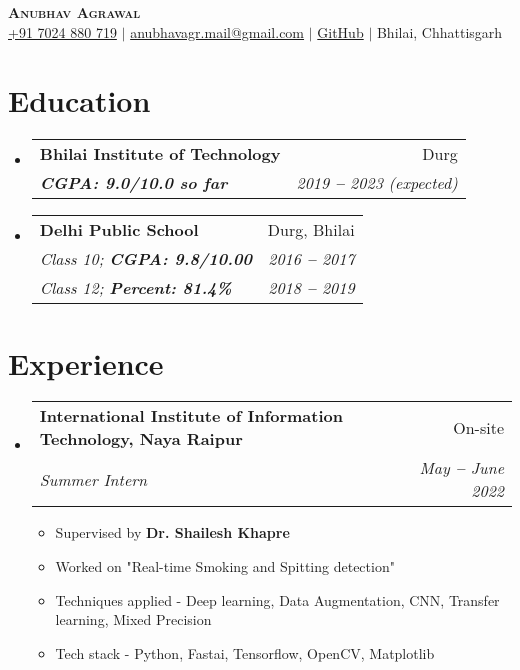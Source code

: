 \documentclass[letterpaper,11pt]{article}
\makeatletter
\newcommand{\resumeItem}[1]{
  \item\small{
    {#1 \vspace{-2pt}}
  }
}
\newcommand{\resumeSubheading}[4]{
  \vspace{-2pt}\item
    \begin{tabular*}{0.97\textwidth}[t]{l@{\extracolsep{\fill}}r}
      \textbf{#1} & #2 \\
      \textit{\small#3} & \textit{\small #4} \\
    \end{tabular*}\vspace{-7pt}
}
\newcommand{\resumeEducationHeading}[6]{
  \vspace{-2pt}\item
    \begin{tabular*}{0.97\textwidth}[t]{l@{\extracolsep{\fill}}r}
      \textbf{#1} & #2 \\
      \textit{\small#3} & \textit{\small #4} \\
      \textit{\small#5} & \textit{\small #6} \\
    \end{tabular*}\vspace{-5pt}
}
\newcommand{\resumeSubHeadingListStart}{\begin{itemize}[leftmargin=0.15in, label={}]}
\newcommand{\resumeSubHeadingListEnd}{\end{itemize}}
\newcommand{\resumeItemListStart}{\begin{itemize}}
\newcommand{\resumeItemListEnd}{\end{itemize}\vspace{-5pt}}
\makeatother
\begin{document}
\begin{center}
    \textbf{\Huge \scshape Anubhav Agrawal} \\ \vspace{3pt}
    \small
    \faMobile \hspace{.5pt} \href{tel:917024880719}{+91 7024 880 719}
    $|$
    \faAt \hspace{.5pt} \href{mailto:anubhavagr.mail@gmail.com}{\color{blue}anubhavagr.mail@gmail.com}
    $|$
    \faGithub \hspace{.5pt} \href{https://github.com/anubhavagr}{\color{blue}GitHub}
    $|$
    \faMapMarker \hspace{.5pt} Bhilai, Chhattisgarh
\end{center}
\section{Education}
  \vspace{3pt}
  \resumeSubHeadingListStart
    \resumeSubheading
      {Bhilai Institute of Technology}
      {Durg}
      {\textbf{CGPA: 9.0/10.0 so far}}{2019 \textbf{--} 2023 (expected)}
    
    \vspace{6pt}
    
    \resumeEducationHeading
      {Delhi Public School}
      {Durg, Bhilai}
      {Class 10;   \textbf{CGPA: 9.8/10.00}}{2016 \textbf{--} 2017}
      {Class 12;   \textbf{Percent: 81.4\%}}{2018 \textbf{--} 2019}
     
  \resumeSubHeadingListEnd
\section{Experience}
  \vspace{3pt}
  \resumeSubHeadingListStart
    
    \resumeSubheading
      {International Institute of Information Technology, Naya Raipur}{On-site}
      {Summer Intern}{May \textbf{--} June 2022}
        \resumeItemListStart
	    \resumeItem{Supervised by \textbf{Dr. Shailesh Khapre}}
            \resumeItem{Worked on "Real-time Smoking and Spitting detection"}
	    \resumeItem{Techniques applied - Deep learning, Data Augmentation, CNN, Transfer learning, Mixed Precision}
	    \resumeItem{Tech stack - Python, Fastai, Tensorflow, OpenCV, Matplotlib}
        \resumeItemListEnd
    
    
  \resumeSubHeadingListEnd
\end{document}
